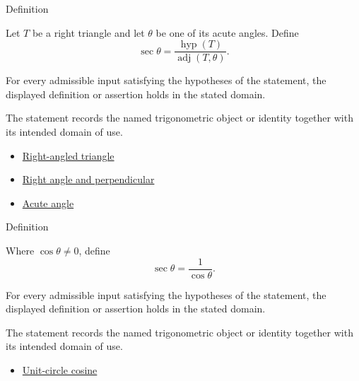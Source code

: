 

\begin{definitionbox}{Definition}
\begin{definition}
\label{def:right-triangle-secant}
Let $T$ be a right triangle and let $\theta$ be one of its acute angles. Define
\[
\sec\theta=\frac{\operatorname{hyp}(T)}{\operatorname{adj}(T,\theta)}.
\]
\end{definition}
\end{definitionbox}
\begin{remark*}
For every admissible input satisfying the hypotheses of the statement, the
displayed definition or assertion holds in the stated domain.
\end{remark*}

\begin{remark*}[Interpretation]
The statement records the named trigonometric object or identity together with
its intended domain of use.
\end{remark*}

\begin{dependencies}
\begin{itemize}
  \item \hyperref[def:euclid-triangle-angle-classes]{Right-angled triangle}
  \item \hyperref[def:euclid-right-angle-and-perpendicular]{Right angle and perpendicular}
  \item \hyperref[def:euclid-acute-angle]{Acute angle}
\end{itemize}
\end{dependencies}



\begin{definitionbox}{Definition}
\begin{definition}
\label{def:extended-secant}
Where $\cos\theta\neq 0$, define
\[
  \sec\theta=\frac{1}{\cos\theta}.
\]
\end{definition}
\end{definitionbox}
\begin{remark*}
For every admissible input satisfying the hypotheses of the statement, the
displayed definition or assertion holds in the stated domain.
\end{remark*}

\begin{remark*}[Interpretation]
The statement records the named trigonometric object or identity together with
its intended domain of use.
\end{remark*}

\begin{dependencies}
\begin{itemize}
  \item \hyperref[def:unit-circle-cosine]{Unit-circle cosine}
\end{itemize}
\end{dependencies}
